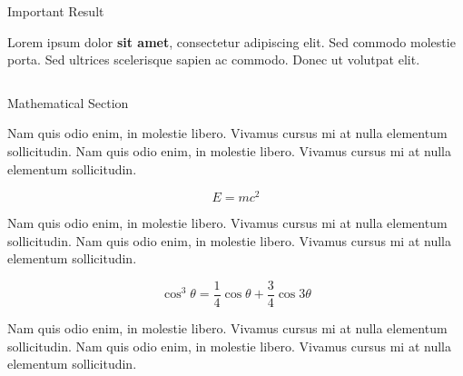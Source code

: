 \documentclass[final]{beamer}
\newlength{\onecolwid}
\newlength{\twocolwid}
\begin{document}
\begin{frame}[t]
\begin{columns}[t]
\begin{column}{\twocolwid}
            \begin{alertblock}{Important Result}

                Lorem ipsum dolor \textbf{sit amet}, consectetur adipiscing elit. Sed commodo molestie porta. Sed ultrices scelerisque sapien ac commodo. Donec ut volutpat elit.

            \end{alertblock}


            \begin{columns}[t,totalwidth=\twocolwid] %

                \begin{column}{\onecolwid} %


                    \begin{block}{Mathematical Section}

                        Nam quis odio enim, in molestie libero. Vivamus cursus mi at nulla elementum sollicitudin. Nam quis odio enim, in molestie libero. Vivamus cursus mi at nulla elementum sollicitudin.

                        \begin{equation}
                            E = mc^{2}
                            \label{eqn:Einstein}
                        \end{equation}

                        Nam quis odio enim, in molestie libero. Vivamus cursus mi at nulla elementum sollicitudin. Nam quis odio enim, in molestie libero. Vivamus cursus mi at nulla elementum sollicitudin.

                        \begin{equation}
                            \cos^3 \theta =\frac{1}{4}\cos\theta+\frac{3}{4}\cos 3\theta
                            \label{eq:refname}
                        \end{equation}

                        Nam quis odio enim, in molestie libero. Vivamus cursus mi at nulla elementum sollicitudin. Nam quis odio enim, in molestie libero. Vivamus cursus mi at nulla elementum sollicitudin.


\end{block}
\end{column}
\end{columns}
\end{column}
\end{columns}
\end{frame}
\end{document}
